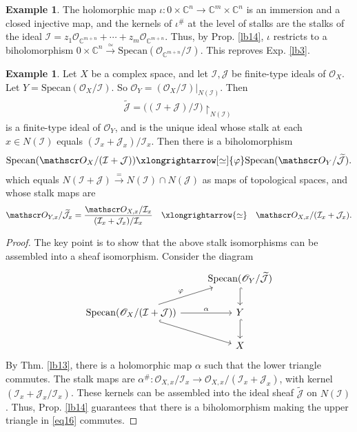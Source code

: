 \documentclass[12pt,b5paper,notitlepage]{report}
\theoremstyle{definition}
\newtheorem{eg}[df]{Example}
\theoremstyle{plain}
\newcommand{\mc}{\mathcal}
\newcommand{\wtd}{\widetilde}
\newcommand{\scr}{\mathscr}
\newcommand{\Cbb}{\mathbb C}
\newcommand{\Specan}{\mathrm{Specan}}
\newcommand{\uph}{\upharpoonright}
\numberwithin{equation}{section}
\begin{document}
\begin{eg}\label{lb22}
The holomorphic map $\iota:0\times\Cbb^n\rightarrow\Cbb^m\times\Cbb^n$ is an immersion and a closed injective map, and the kernels of $\iota^\#$ at the level  of stalks are the stalks of the ideal $\mc I=z_1\scr O_{\Cbb^{m+n}}+\cdots+ z_m\scr O_{\Cbb^{m+n}}$. Thus, by Prop. \ref{lb14}, $\iota$ restricts to a biholomorphism $0\times\Cbb^n\xrightarrow{\simeq}\Specan(\scr O_{\Cbb^{m+n}}/\mc I)$. This reproves Exp. \ref{lb3}.
\end{eg}



\begin{eg}\label{lb23}
Let $X$ be a complex space, and let $\mc I,\mc J$ be finite-type ideals of $\scr O_X$. Let $Y=\Specan(\scr O_X/\mc I)$. So $\scr O_Y=(\scr O_X/\mc I)|_{N(\mc I)}$. Then
\begin{align*}
\wtd {\mc J}=\big((\mc I+\mc J)/\mc I\big)\uph_{N(\mc I)}
\end{align*}
is a finite-type ideal of $\scr O_Y$, and is the unique ideal whose stalk at each $x\in N(\mc I)$ equals $(\mc I_x+\mc J_x)/\mc I_x$. Then there is a biholomorphism
\begin{align}
\Specan(\scr O_X/(\mc I+\mc J))\xlongrightarrow[\simeq]{\varphi} \Specan(\scr O_Y/\wtd{\mc J}).
\end{align}
which equals $N(\mc I+\mc J)\xrightarrow{=}N(\mc I)\cap N(\mc J)$ as maps of topological spaces, and whose stalk maps are
\begin{align*}
\scr O_{Y,x}/\wtd{\mc J}_x=\frac{\scr O_{X,x}/\mc I_x}{(\mc I_x+\mc J_x)/\mc I_x}\quad\xlongrightarrow{\simeq}\quad\scr O_{X,x}/(\mc I_x+\mc J_x).
\end{align*}
\end{eg}



\begin{proof}
The key point is to show that the above stalk isomorphisms can be assembled into a sheaf isomorphism. Consider the diagram
\begin{equation}\label{eq16}
\begin{tikzcd}
                                             & \Specan(\scr O_Y/\wtd{\mc J}) \arrow[d, hook] \\
\Specan(\scr O_X/(\mc I+\mc J)) \arrow[r, "\alpha"] \arrow[rd,hook ] \arrow[ru,"\varphi"] & Y \arrow[d, hook] \\
                                             & X                
\end{tikzcd}
\end{equation}
By Thm. \ref{lb13}, there is a holomorphic map $\alpha$ such that the lower triangle commutes. The stalk maps are $\alpha^\#:\scr O_{X,x}/\mc I_x\rightarrow\scr O_{X,x}/(\mc I_x+\mc J_x)$, with kernel $(\mc I_x+\mc J_x/\mc I_x)$. These kernels can be assembled into the ideal sheaf $\wtd{\mc J}$ on $N(\mc I)$. Thus, Prop. \ref{lb14} guarantees that there is a biholomorphism making the upper triangle in \eqref{eq16} commutes.
\end{proof}
\end{document}
